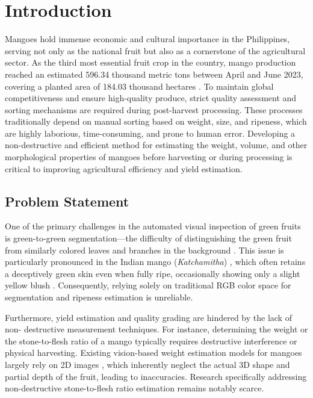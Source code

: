 \section{Introduction}

Mangoes hold immense economic and cultural importance in the Philippines, serving
not only as the national fruit but also as a cornerstone of the agricultural sector.
As the third most essential fruit crop in the country, mango production reached an
estimated 596.34 thousand metric tons between April and June 2023, covering a
planted area of 184.03 thousand hectares \cite{philippineMangoIndustry}. To maintain
global competitiveness and ensure high-quality produce, strict quality assessment
and sorting mechanisms are required during post-harvest processing. These
processes traditionally depend on manual sorting based on weight, size, and ripeness,
which are highly laborious, time-consuming, and prone to human error. Developing a
non-destructive and efficient method for estimating the weight, volume, and other
morphological properties of mangoes before harvesting or during processing is
critical to improving agricultural efficiency and yield estimation.

\subsection{Problem Statement}
One of the primary challenges in the automated visual inspection of green fruits is
green-to-green segmentation---the difficulty of distinguishing the green fruit from
similarly colored leaves and branches in the background \cite{depthcl}. This issue is
particularly pronounced in the Indian mango (\textit{Katchamitha}) \cite{Katchamitha2025},
which often retains a deceptively green skin even when fully ripe, occasionally
showing only a slight yellow blush \cite{Katchamitha20252}. Consequently, relying
solely on traditional RGB color space for segmentation and ripeness estimation is
unreliable. 

Furthermore, yield estimation and quality grading are hindered by the lack of non-
destructive measurement techniques. For instance, determining the weight or the
stone-to-flesh ratio of a mango typically requires destructive interference or
physical harvesting. Existing vision-based weight estimation models for mangoes
largely rely on 2D images \cite{volume2020mango, shape2015mango}, which inherently
neglect the actual 3D shape and partial depth of the fruit, leading to inaccuracies.
Research specifically addressing non-destructive stone-to-flesh ratio estimation
remains notably scarce.

